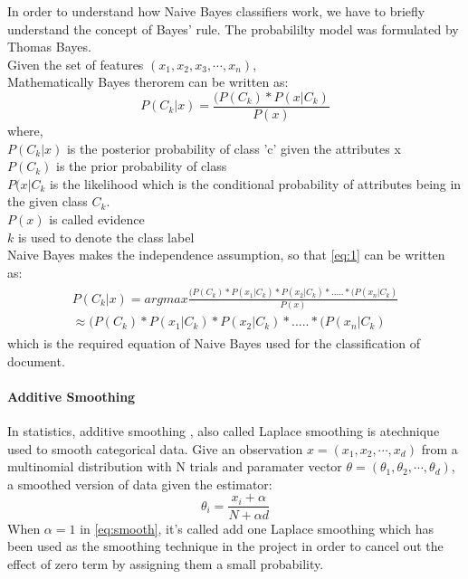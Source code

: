 In order to understand how Naive Bayes classifiers \cite{naive} work, we have to briefly understand the concept of Bayes' rule. The probabililty model was formulated by Thomas Bayes.\\
Given the set of features $(x_1,x_2,x_3,\cdots, x_n)$, \\
Mathematically Bayes therorem can be written as:
\begin{equation}\label{eq:1}
P(C_{k}|x) = \frac{(P(C_{k}) * P(x|C_{k})} { P(x)}
\end{equation}
where,\\
$P(C_{k} |x)$ is the posterior probability of class 'c' given the attributes x \\
$P(C_{k})$ is the prior probability of class \\
$P(x|C_{k}$ is the likelihood which is the conditional probability of attributes being in the given class $C_k$.\\
$P(x)$ is called evidence \\
$k$ is used to denote the class label \\
Naive Bayes makes the independence assumption, so that \ref{eq:1} can be written as:
\begin{align}
\begin{split}\label{eq:naive}
P(C_{k}|x) = argmax \frac{(P(C_{k}) * P(x_1|C_{k}) * P(x_2|C_{k})*.....* (P(x_n|C_{k})} { P(x)} \\
\approx  (P(C_{k}) * P(x_1|C_{k}) * P(x_2|C_{k})*.....* (P(x_n|C_{k})
\end{split}
\end{align}
which is the required equation of Naive Bayes used for the classification of document.

\paragraph{Additive Smoothing}\hfill

In statistics, additive smoothing \cite{additive}, also called Laplace smoothing is atechnique used to smooth categorical data. Give an observation $x = (x_1,x_2,\cdots,x_d)$ from a multinomial distribution with N trials and paramater vector $\theta = (\theta_1,\theta_2,\cdots,\theta_d)$, a smoothed version of data given the estimator:
\begin{equation}\label{eq:smooth}
	\theta_i = \frac{x_i + \alpha}{N+ \alpha d}
\end{equation}
When $\alpha = 1 $ in \ref{eq:smooth}, it's called add one Laplace smoothing which has been used as the smoothing technique in the project in order to cancel out the effect of zero term by assigning them a small probability.

